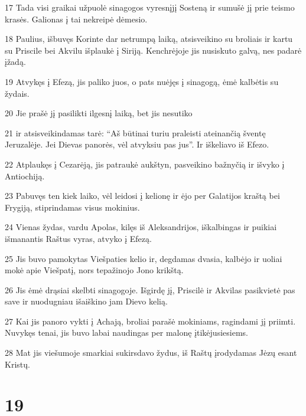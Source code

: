 \par 17 Tada visi graikai užpuolė sinagogos vyresnįjį Sosteną ir sumušė jį prie teismo krasės. Galionas į tai nekreipė dėmesio. 
\par 18 Paulius, išbuvęs Korinte dar netrumpą laiką, atsisveikino su broliais ir kartu su Priscile bei Akvilu išplaukė į Siriją. Kenchrėjoje jis nusiskuto galvą, nes padarė įžadą. 
\par 19 Atvykęs į Efezą, jis paliko juos, o pats nuėjęs į sinagogą, ėmė kalbėtis su žydais. 
\par 20 Jie prašė jį pasilikti ilgesnį laiką, bet jis nesutiko 
\par 21 ir atsisveikindamas tarė: “Aš būtinai turiu praleisti ateinančią šventę Jeruzalėje. Jei Dievas panorės, vėl atvyksiu pas jus”. Ir iškeliavo iš Efezo. 
\par 22 Atplaukęs į Cezarėją, jis patraukė aukštyn, pasveikino bažnyčią ir išvyko į Antiochiją. 
\par 23 Pabuvęs ten kiek laiko, vėl leidosi į kelionę ir ėjo per Galatijos kraštą bei Frygiją, stiprindamas visus mokinius. 
\par 24 Vienas žydas, vardu Apolas, kilęs iš Aleksandrijos, iškalbingas ir puikiai išmanantis Raštus vyras, atvyko į Efezą. 
\par 25 Jis buvo pamokytas Viešpaties kelio ir, degdamas dvasia, kalbėjo ir uoliai mokė apie Viešpatį, nors tepažinojo Jono krikštą. 
\par 26 Jis ėmė drąsiai skelbti sinagogoje. Išgirdę jį, Priscilė ir Akvilas pasikvietė pas save ir nuodugniau išaiškino jam Dievo kelią. 
\par 27 Kai jis panoro vykti į Achają, broliai parašė mokiniams, ragindami jį priimti. Nuvykęs tenai, jis buvo labai naudingas per malonę įtikėjusiesiems. 
\par 28 Mat jis viešumoje smarkiai sukirsdavo žydus, iš Raštų įrodydamas Jėzų esant Kristų.


\chapter{19}


